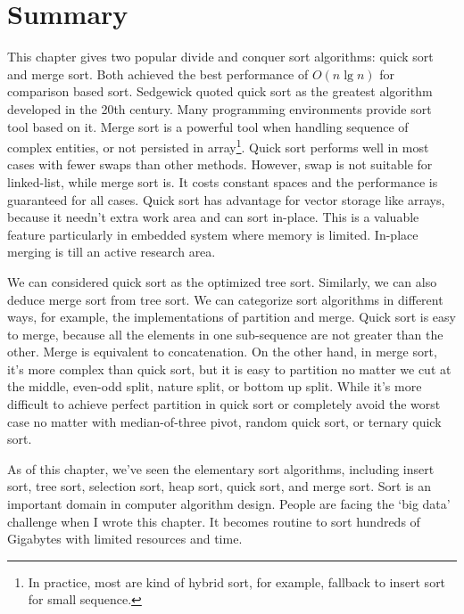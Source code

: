 \documentclass[b5paper]{article}
\begin{document}
\section{Summary}

This chapter gives two popular divide and conquer sort algorithms: quick sort and merge sort. Both achieved the best performance of $O(n \lg n)$ for comparison based sort. Sedgewick quoted quick sort as the greatest algorithm developed in the 20th century. Many programming environments provide sort tool based on it. Merge sort is a powerful tool when handling sequence of complex entities, or not persisted in array\footnote{In practice, most are kind of hybrid sort, for example, fallback to insert sort for small sequence.}. Quick sort performs well in most cases with fewer swaps than other methods. However, swap is not suitable for linked-list, while merge sort is. It costs constant spaces and the performance is guaranteed for all cases. Quick sort has advantage for vector storage like arrays, because it needn't extra work area and can sort in-place. This is a valuable feature particularly in embedded system where memory is limited. In-place merging is till an active research area.

We can considered quick sort as the optimized tree sort. Similarly, we can also deduce merge sort from tree sort\cite{sort-deriving}. We can categorize sort algorithms in different ways\cite{TAOCP}, for example, the implementations of partition and merge\cite{algo-fp}. Quick sort is easy to merge, because all the elements in one sub-sequence are not greater than the other. Merge is equivalent to concatenation. On the other hand, in merge sort, it's more complex than quick sort, but it is easy to partition no matter we cut at the middle, even-odd split, nature split, or bottom up split. While it's more difficult to achieve perfect partition in quick sort or completely avoid the worst case no matter with median-of-three pivot, random quick sort, or ternary quick sort.

As of this chapter, we've seen the elementary sort algorithms, including insert sort, tree sort, selection sort, heap sort, quick sort, and merge sort. Sort is an important domain in computer algorithm design. People are facing the `big data' challenge when I wrote this chapter. It becomes routine to sort hundreds of Gigabytes with limited resources and time.

\begin{Exercise}
\end{Exercise}
\end{document}
